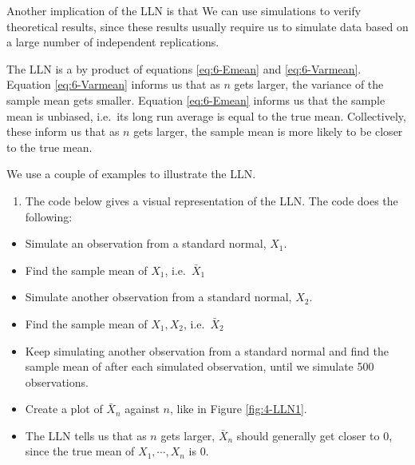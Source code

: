\documentclass[
]{book}
\providecommand{\tightlist}{%
  \setlength{\itemsep}{0pt}\setlength{\parskip}{0pt}}
\begin{document}
Another implication of the LLN is that We can use simulations to verify theoretical results, since these results usually require us to simulate data based on a large number of independent replications.

The LLN is a by product of equations \eqref{eq:6-Emean} and \eqref{eq:6-Varmean}. Equation \eqref{eq:6-Varmean} informs us that as \(n\) gets larger, the variance of the sample mean gets smaller. Equation \eqref{eq:6-Emean} informs us that the sample mean is unbiased, i.e.~its long run average is equal to the true mean. Collectively, these inform us that as \(n\) gets larger, the sample mean is more likely to be closer to the true mean.

We use a couple of examples to illustrate the LLN.

\begin{enumerate}
\def\labelenumi{\arabic{enumi}.}
\tightlist
\item
  The code below gives a visual representation of the LLN. The code does the following:
\end{enumerate}

\begin{itemize}
\tightlist
\item
  Simulate an observation from a standard normal, \(X_1\).
\item
  Find the sample mean of \(X_1\), i.e.~\(\bar{X}_1\)
\item
  Simulate another observation from a standard normal, \(X_2\).
\item
  Find the sample mean of \(X_1, X_2\), i.e.~\(\bar{X}_2\)
\item
  Keep simulating another observation from a standard normal and find the sample mean of after each simulated observation, until we simulate 500 observations.
\item
  Create a plot of \(\bar{X}_n\) against \(n\), like in Figure \ref{fig:4-LLN1}.
\item
  The LLN tells us that as \(n\) gets larger, \(\bar{X}_n\) should generally get closer to 0, since the true mean of \(X_1, \cdots, X_n\) is 0.
\end{itemize}
\end{document}
